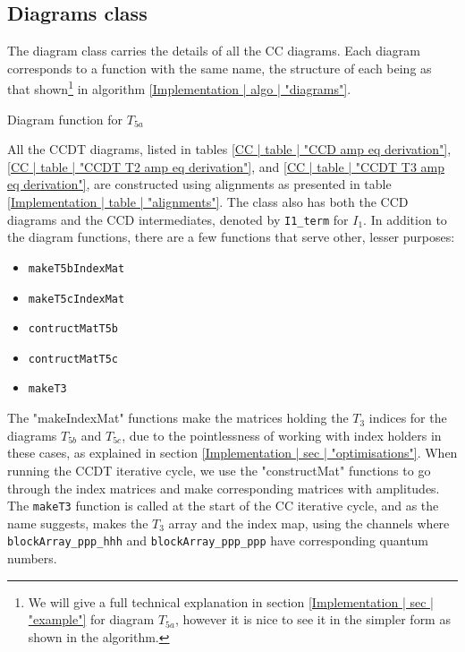 \documentclass[10pt,twoside]{report}
\begin{document}
	\subsection{Diagrams class}
	The diagram class carries the details of all the CC diagrams. Each diagram corresponds to a function with the same name, the structure of each being as that shown\footnote{We will give a full technical explanation in section \ref{Implementation | sec | "example"} for diagram $T_{5a}$, however it is nice to see it in the simpler form as shown in the algorithm.} in algorithm \ref{Implementation | algo | "diagrams"}.
	
	\begin{algorithm}[H]
		\BlankLine
		\BlankLine
		\caption{Diagram function for $T_{5a}$}
		\label{Implementation | algo | "diagrams"}
	\end{algorithm}
	
	\BlankLine
	\BlankLine
	
	All the CCDT diagrams, listed in tables \ref{CC | table | "CCD amp eq derivation"}, \ref{CC | table | "CCDT T2 amp eq derivation"}, and \ref{CC | table | "CCDT T3 amp eq derivation"}, are constructed using alignments as presented in table \ref{Implementation | table | "alignments"}. The class also has both the CCD diagrams and the CCD intermediates, denoted by \texttt{I1\_term} for $I_1$. In addition to the diagram functions, there are a few functions that serve other, lesser purposes:
	
	\begin{itemize}
		\item \texttt{makeT5bIndexMat}
		\item \texttt{makeT5cIndexMat}
		\item \texttt{contructMatT5b}
		\item \texttt{contructMatT5c}
		\item \texttt{makeT3}
	\end{itemize}
	
	The "makeIndexMat" functions make the matrices holding the $T_3$ indices for the diagrams $T_{5b}$ and $T_{5c}$, due to the pointlessness of working with index holders in these cases, as explained in section \ref{Implementation | sec | "optimisations"}. When running the CCDT iterative cycle, we use the "constructMat" functions to go through the index matrices and make corresponding matrices with amplitudes. The \texttt{makeT3} function is called at the start of the CC iterative cycle, and as the name suggests, makes the $T_3$ array and the index map, using the channels where \texttt{blockArray\_ppp\_hhh} and \texttt{blockArray\_ppp\_ppp} have corresponding quantum numbers.
	
\end{document}
